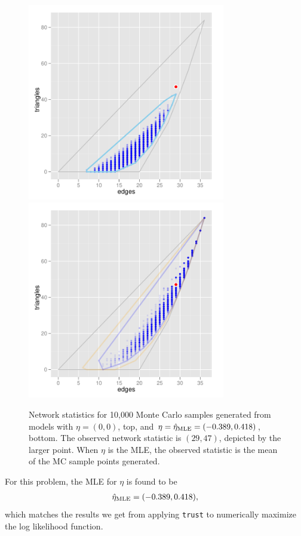 \begin{figure}[h!]
\centering
\includegraphics[width=3.4in]{Figures/MCsample-far}
\includegraphics[width=3.4in]{Figures/MCsample-MLE}
\caption[Network statistics for 10,000 Monte Carlo samples when MLE exists]
{Network statistics for 10,000 Monte Carlo samples generated from models 
with $\eta= (0,0)$, top, and $\eta = \hat{\eta}_{\textrm{MLE}} = (-0.389, 0.418)$,
bottom.  The observed network statistic is $(29,47)$, depicted by the 
larger point.  When $\eta$ is the MLE, the observed statistic is 
the mean of the MC sample points generated. }
\label{F:MC cloud}
\end{figure}
For this problem, the MLE for $\eta$ is found to be
\begin{align*}
\hat{\eta}_{\textrm{MLE}} = (-0.389, 0.418),
\end{align*}
which matches the results we get from applying \texttt{trust} to numerically
maximize the log likelihood function.

